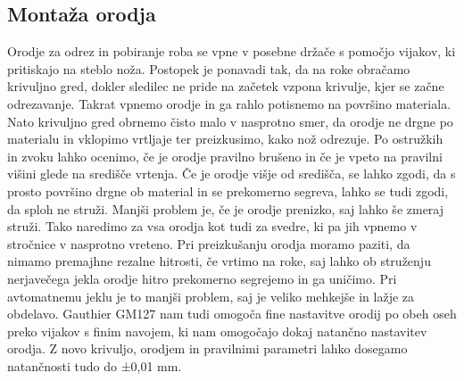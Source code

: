\subsection{Montaža orodja}
Orodje za odrez in pobiranje roba se vpne v posebne držače
s pomočjo vijakov, ki pritiskajo na steblo noža. Postopek je ponavadi tak,
da na roke obračamo krivuljno gred, dokler sledilec ne pride
na začetek vzpona krivulje, kjer se začne odrezavanje. Takrat vpnemo orodje
in ga rahlo potisnemo na površino materiala. Nato krivuljno gred
obrnemo čisto malo v nasprotno smer, da orodje ne drgne po materialu
in vklopimo vrtljaje ter preizkusimo, kako nož odrezuje. Po ostružkih
in zvoku lahko ocenimo, če je orodje pravilno brušeno in če je vpeto
na pravilni višini glede na središče vrtenja. Če je orodje višje od
središča, se lahko zgodi, da s prosto površino drgne ob material in
se prekomerno segreva, lahko se tudi zgodi, da sploh ne struži.
Manjši problem je, če je orodje prenizko, saj lahko še zmeraj
struži. Tako naredimo za vsa orodja kot tudi za svedre,
ki pa jih vpnemo v stročnice v nasprotno vreteno. Pri preizkušanju
orodja moramo paziti, da nimamo premajhne rezalne hitrosti, če
vrtimo na roke, saj lahko ob struženju nerjavečega jekla orodje
hitro prekomerno segrejemo in ga uničimo. Pri avtomatnemu jeklu
je to manjši problem, saj je veliko mehkejše in lažje za obdelavo.
Gauthier GM127 nam tudi omogoča fine nastavitve orodij po obeh oseh
preko vijakov s finim navojem, ki nam omogočajo dokaj natančno
nastavitev orodja. Z novo krivuljo, orodjem in pravilnimi parametri
lahko dosegamo natančnosti tudo do ±0,01 mm.
